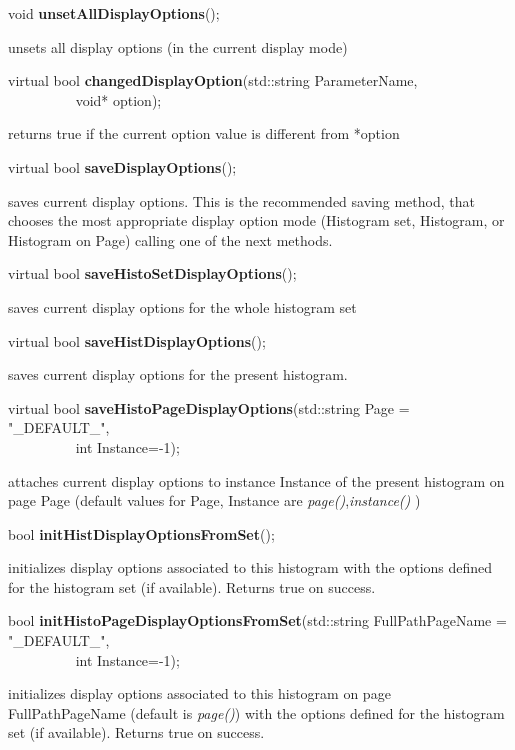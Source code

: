 \item    void {\bf unsetAllDisplayOptions}();


 unsets all display options (in the current display mode)


\item    virtual bool {\bf changedDisplayOption}(std::string ParameterName,\\\mbox{}~~~~~~~~~ 
				    void* option);

 returns true if the current option value is different from *option


\item    virtual bool {\bf saveDisplayOptions}();


 saves current display options.  This is the recommended saving method, that
 chooses the most appropriate display option mode 
 (Histogram set, Histogram, or Histogram on Page) calling one of the next methods.


\item    virtual bool {\bf saveHistoSetDisplayOptions}();


 saves current display options for the whole histogram set


\item    virtual bool {\bf saveHistDisplayOptions}();


 saves current display options for the present histogram.


\item    virtual bool {\bf saveHistoPageDisplayOptions}(std::string Page = "\_DEFAULT\_",\\\mbox{}~~~~~~~~~
					   int Instance=-1);

 attaches current display options to instance Instance of the present histogram on page 
 Page (default values for Page, Instance are {\it page()},{\it instance()}  )


\item    bool {\bf initHistDisplayOptionsFromSet}(); 


 initializes display options associated to this histogram with the
 options defined for the histogram set (if available). Returns true on
 success.


\item    bool {\bf initHistoPageDisplayOptionsFromSet}(std::string FullPathPageName = "\_DEFAULT\_",\\\mbox{}~~~~~~~~~
					  int Instance=-1);

 initializes display options associated to this histogram on page
 FullPathPageName (default is {\it page()}) with the
 options defined for the histogram set (if available). Returns true on
 success.


